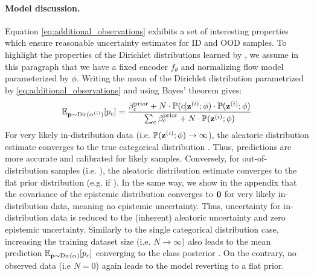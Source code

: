 \paragraph{Model discussion.} Equation \ref{eq:additional_observations} exhibits a set of interesting properties which ensure reasonable uncertainty estimates for ID and OOD samples. To highlight the properties of the Dirichlet distributions learned by \PostNetacro, we assume in this paragraph that we have a fixed encoder $f_\theta$ and normalizing flow model parameterized by $\phi$. Writing the mean of the Dirichlet distribution parametrized by \eqref{eq:additional_observations} and using Bayes' theorem gives:
\begin{equation}
\mathbb{E}_{\mathbf{p}\sim \mathrm{Dir}(\mathbf{\alpha}^{(i)})}[p_c] = \frac{\beta_c^\text{prior} + N \cdot \mathbb{P}(c | \bold{z}^{(i)}; \phi) \cdot \mathbb{P}(\bold{z}^{(i)}; \phi)}{\sum_c\beta_c^\text{prior} + N \cdot \mathbb{P}(\bold{z}^{(i)}; \phi)}
\end{equation}
For very likely in-distribution data (i.e. $\mathbb{P}(\bold{z}^{(i)} ; \phi) \rightarrow \infty$), the aleatoric distribution estimate  converges to the true categorical distribution \smash{$\prob(\iclass|\latent \dataix; \phi)$}. Thus, predictions are more accurate and calibrated for likely samples. Conversely, for out-of-distribution samples (i.e. ), the aleatoric distribution estimate  converges to the flat prior distribution (e.g.  if ). In the same way, we show in the appendix that the covariance of the epistemic distribution converges to $\mathbf{0}$ for very likely in-distribution data, meaning no epistemic uncertainty. Thus, uncertainty for in-distribution data is reduced to the (inherent) aleatoric uncertainty and zero epistemic uncertainty.
%
Similarly to the single categorical distribution case, increasing the training dataset size (i.e. $N \rightarrow \infty$) also leads to the mean prediction $\mathbb{E}_{\mathbf{p}\sim \mathrm{Dir}(\mathbf{\alpha})}[p_c]$ converging to the class posterior . On the contrary, no observed data (i.e $N=0$) again leads to the model reverting to a flat prior.

